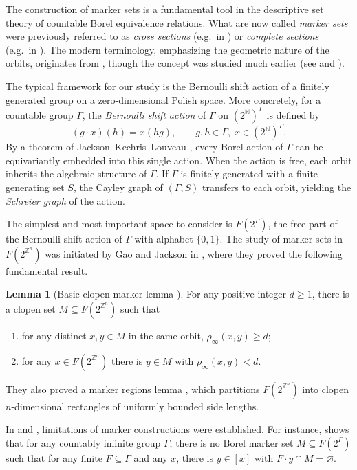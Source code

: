 \documentclass{amsart}
\theoremstyle{definition}
\newtheorem{lemma}[theorem]{Lemma}
\begin{document}
The construction of marker sets is a fundamental tool in the descriptive set
theory of countable Borel equivalence relations. What are now called
{\em marker sets} were previously referred to as {\em cross sections}
(e.g.\ in \cite{We84}) or {\em complete sections} (e.g.\ in \cite{DJK94}).
The modern terminology, emphasizing the geometric nature of the orbits,
originates from \cite{JKL02}, though the concept was studied much earlier
(see \cite{SS88} and \cite{BK96}).

The typical framework for our study is the Bernoulli shift action of a
finitely generated group on a zero-dimensional Polish space. More concretely,
for a countable group $\Gamma$, the {\em Bernoulli shift action} of $\Gamma$
on $(2^{\mathbb{N}})^\Gamma$ is defined by
\[
(g\cdot x)(h)=x(hg),\qquad g,h\in\Gamma,\; x\in (2^{\mathbb{N}})^\Gamma.
\]
By a theorem of Jackson--Kechris--Louveau \cite[Proposition 4.2]{JKL02},
every Borel action of $\Gamma$ can be equivariantly embedded into this single
action. When the action is free, each orbit inherits the algebraic structure
of $\Gamma$. If $\Gamma$ is finitely generated with a finite generating
set $S$, the Cayley graph of $(\Gamma, S)$ transfers to each orbit, yielding
the {\em Schreier graph} of the action.

The simplest and most important space to consider is $F(2^\Gamma)$, the free
part of the Bernoulli shift action of $\Gamma$ with alphabet $\{0,1\}$.
The study of marker sets in $F(2^{\mathbb{Z}^n})$ was initiated by Gao and
Jackson in \cite{GJ15}, where they proved the following fundamental result.

\begin{lemma}[Basic clopen marker lemma {\cite[Lemma 2.1]{GJ15}}]
\label{lem:basicmarker-intro}
For any positive integer $d\geq 1$, there is a clopen set
$M\subseteq F(2^{\mathbb{Z}^n})$ such that
\begin{enumerate}
\item[(1)] for any distinct $x, y\in M$ in the same orbit,
$\rho_\infty(x,y)\geq d$;
\item[(2)] for any $x\in F(2^{\mathbb{Z}^n})$ there is $y\in M$
with $\rho_\infty(x,y)<d$.
\end{enumerate}
\end{lemma}

They also proved a marker regions lemma \cite[Theorem 3.1]{GJ15}, which
partitions $F(2^{\mathbb{Z}^n})$ into clopen $n$-dimensional rectangles
of uniformly bounded side lengths.

In \cite{GJKS22} and \cite{GJKS23}, limitations of marker constructions
were established. For instance, \cite[Theorem 1.2]{GJKS22} shows that for
any countably infinite group $\Gamma$, there is no Borel marker set
$M\subseteq F(2^\Gamma)$ such that for any finite $F\subseteq \Gamma$
and any $x$, there is $y\in [x]$ with $F\cdot y\cap M=\varnothing$.
\end{document}
